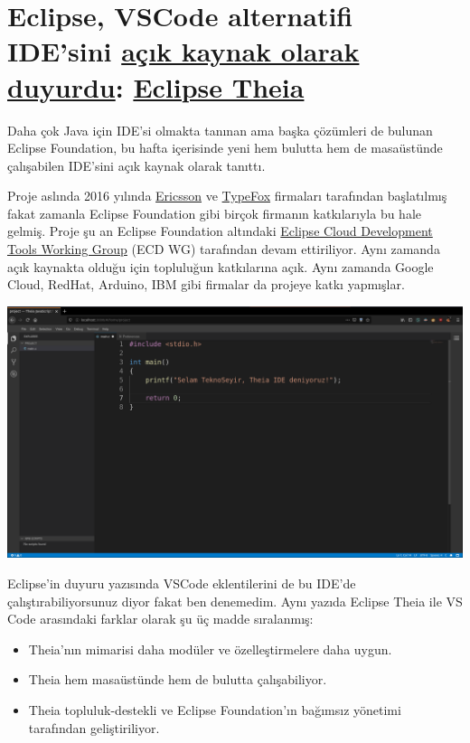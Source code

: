 \documentclass[11pt]{article}
\begin{document}
\section{Eclipse, VSCode alternatifi IDE'sini \href{https://www.eclipse.org/org/press-release/20200331-theia.php}{açık kaynak olarak duyurdu}: \href{https://theia-ide.org/\#features}{Eclipse Theia}}
\label{sec:org2733a55}
Daha çok Java için IDE'si olmakta tanınan ama başka çözümleri de bulunan
Eclipse Foundation, bu hafta içerisinde yeni hem bulutta hem de masaüstünde
çalışabilen IDE'sini açık kaynak olarak tanıttı.

Proje aslında 2016 yılında \href{https://www.ericsson.com/en}{Ericsson} ve \href{https://www.typefox.io/}{TypeFox} firmaları tarafından
başlatılmış fakat zamanla Eclipse Foundation gibi birçok firmanın katkılarıyla
bu hale gelmiş. Proje şu an Eclipse Foundation altındaki \href{https://ecdtools.eclipse.org/}{Eclipse Cloud
Development Tools Working Group} (ECD WG) tarafından devam ettiriliyor. Aynı
zamanda açık kaynakta olduğu için topluluğun katkılarına açık. Aynı zamanda
Google Cloud, RedHat, Arduino, IBM gibi firmalar da projeye katkı yapmışlar.

\begin{center}
\includegraphics[width=.9\linewidth]{gorseller/eclipse-theia-demo.png}
\end{center}

Eclipse'in duyuru yazısında VSCode eklentilerini de bu IDE'de
çalıştırabiliyorsunuz diyor fakat ben denemedim. Aynı yazıda Eclipse Theia ile
VS Code arasındaki farklar olarak şu üç madde sıralanmış:

\begin{itemize}
\item Theia'nın mimarisi daha modüler ve özelleştirmelere daha uygun.
\item Theia hem masaüstünde hem de bulutta çalışabiliyor.
\item Theia topluluk-destekli ve Eclipse Foundation'ın bağımsız yönetimi
tarafından geliştiriliyor.
\end{itemize}
\end{document}
